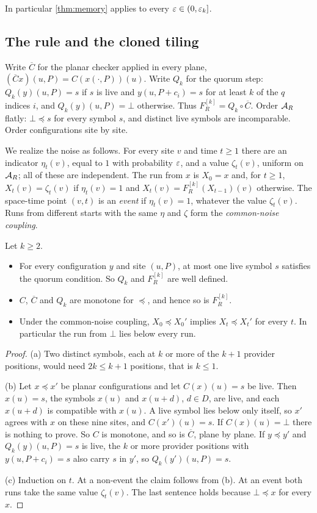 In particular \cref{thm:memory} applies to every $\varepsilon\in(0,\varepsilon_k]$.

\subsection{The rule and the cloned tiling}\label{mem:rule}

Write $\overline C$ for the planar checker applied in every plane, $(\overline Cx)(u,P)=C(x(\cdot,P))(u)$. Write $Q_k$ for the quorum step: $Q_k(y)(u,P)=s$ if $s$ is live and $y(u,P+c_i)=s$ for at least $k$ of the $q$ indices $i$, and $Q_k(y)(u,P)=\bot$ otherwise. Thus $F^{[k]}_R=Q_k\circ\overline C$. Order $\mathcal{A}_R$ flatly: $\bot\preceq s$ for every symbol $s$, and distinct live symbols are incomparable. Order configurations site by site.

We realize the noise as follows. For every site $v$ and time $t\ge1$ there are an indicator $\eta_t(v)$, equal to $1$ with probability $\varepsilon$, and a value $\zeta_t(v)$, uniform on $\mathcal{A}_R$; all of these are independent. The run from $x$ is $X_0=x$ and, for $t\ge1$, $X_t(v)=\zeta_t(v)$ if $\eta_t(v)=1$ and $X_t(v)=F^{[k]}_R(X_{t-1})(v)$ otherwise. The space-time point $(v,t)$ is an \emph{event} if $\eta_t(v)=1$, whatever the value $\zeta_t(v)$. Runs from different starts with the same $\eta$ and $\zeta$ form the \emph{common-noise coupling}.

\begin{lemma}\label{mem:basic}
Let $k\ge2$.
\begin{itemize}
\item[(a)] For every configuration $y$ and site $(u,P)$, at most one live symbol $s$ satisfies the quorum condition. So $Q_k$ and $F^{[k]}_R$ are well defined.
\item[(b)] $C$, $\overline C$ and $Q_k$ are monotone for $\preceq$, and hence so is $F^{[k]}_R$.
\item[(c)] Under the common-noise coupling, $X_0\preceq X_0'$ implies $X_t\preceq X_t'$ for every $t$. In particular the run from $\bot$ lies below every run.
\end{itemize}
\end{lemma}

\begin{proof}
(a) Two distinct symbols, each at $k$ or more of the $k+1$ provider positions, would need $2k\le k+1$ positions, that is $k\le1$.

(b) Let $x\preceq x'$ be planar configurations and let $C(x)(u)=s$ be live. Then $x(u)=s$, the symbols $x(u)$ and $x(u+d)$, $d\in D$, are live, and each $x(u+d)$ is compatible with $x(u)$. A live symbol lies below only itself, so $x'$ agrees with $x$ on these nine sites, and $C(x')(u)=s$. If $C(x)(u)=\bot$ there is nothing to prove. So $C$ is monotone, and so is $\overline C$, plane by plane. If $y\preceq y'$ and $Q_k(y)(u,P)=s$ is live, the $k$ or more provider positions with $y(u,P+c_i)=s$ also carry $s$ in $y'$, so $Q_k(y')(u,P)=s$.

(c) Induction on $t$. At a non-event the claim follows from (b). At an event both runs take the same value $\zeta_t(v)$. The last sentence holds because $\bot\preceq x$ for every $x$.
\end{proof}

